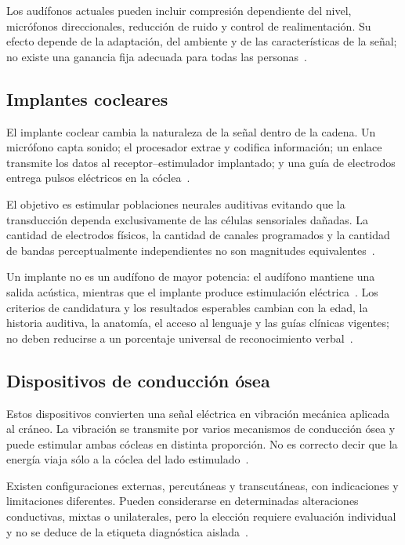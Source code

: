 Los audífonos actuales pueden incluir compresión dependiente del
nivel, micrófonos direccionales, reducción de ruido y control de
realimentación. Su efecto depende de la adaptación, del ambiente y de las
características de la señal; no existe una ganancia fija adecuada para todas
las personas~\cite{whoHearing2021}.

\subsection{Implantes cocleares}
\label{sec:u8-implantes}

El implante coclear cambia la naturaleza de la señal dentro de la cadena. Un
micrófono capta sonido; el procesador extrae y codifica información; un enlace
transmite los datos al receptor--estimulador implantado; y una guía de
electrodos entrega pulsos eléctricos en la cóclea~\cite{nidcdCI2024}.

El objetivo es estimular poblaciones neurales auditivas evitando que
la transducción dependa exclusivamente de las células sensoriales dañadas. La
cantidad de electrodos físicos, la cantidad de canales programados y la
cantidad de bandas perceptualmente independientes no son magnitudes
equivalentes~\cite{nidcdCI2024}.

Un implante no es un audífono de mayor potencia: el audífono mantiene
una salida acústica, mientras que el implante produce estimulación eléctrica~\cite{nidcdCI2024}.
Los criterios de candidatura y los resultados esperables cambian con
la edad, la historia auditiva, la anatomía, el acceso al lenguaje y las guías
clínicas vigentes; no deben reducirse a un porcentaje universal de
reconocimiento verbal~\cite{nidcdCI2024}.

\subsection{Dispositivos de conducción ósea}
\label{sec:u8-conduccion-osea}

Estos dispositivos convierten una señal eléctrica en vibración mecánica
aplicada al cráneo. La vibración se transmite por varios mecanismos de
conducción ósea y puede estimular ambas cócleas en distinta proporción. No es
correcto decir que la energía viaja sólo a la cóclea del lado estimulado~\cite{stenfeltGoode2005,whoHearing2021}.

Existen configuraciones externas, percutáneas y transcutáneas, con
indicaciones y limitaciones diferentes. Pueden considerarse en determinadas
alteraciones conductivas, mixtas o unilaterales, pero la elección requiere
evaluación individual y no se deduce de la etiqueta diagnóstica aislada~\cite{stenfeltGoode2005,whoHearing2021}.

